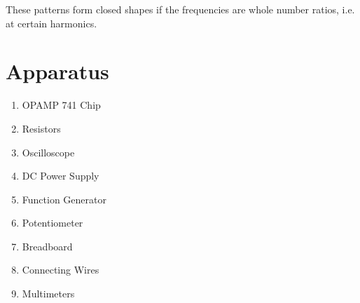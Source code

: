These patterns form closed shapes if the frequencies are whole number ratios, i.e. at certain harmonics. 
\section{Apparatus}

\begin{enumerate}
    \item OPAMP 741 Chip
    \item Resistors
    \item Oscilloscope
    \item DC Power Supply
    \item Function Generator
    \item Potentiometer
    \item Breadboard
    \item Connecting Wires
    \item Multimeters
\end{enumerate}